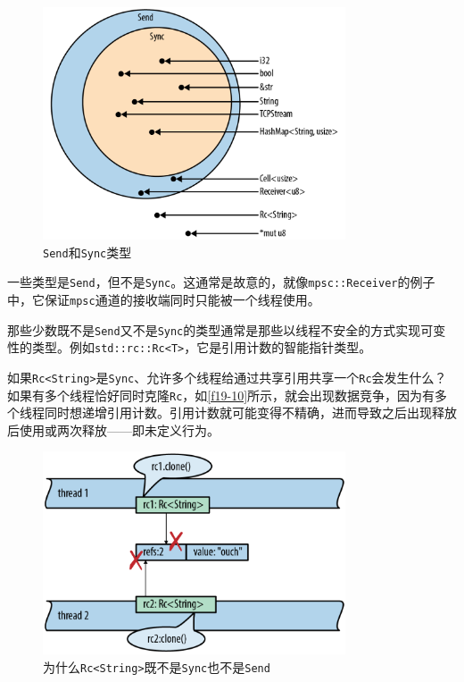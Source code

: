 \begin{figure}[htbp]
    \centering
    \includegraphics[width=0.8\textwidth]{../img/f19-9.png}
    \caption{\texttt{Send}和\texttt{Sync}类型}
    \label{f19-9}
\end{figure}

一些类型是\texttt{Send}，但不是\texttt{Sync}。这通常是故意的，就像\texttt{mpsc::Receiver}的例子中，它保证\texttt{mpsc}通道的接收端同时只能被一个线程使用。

那些少数既不是\texttt{Send}又不是\texttt{Sync}的类型通常是那些以线程不安全的方式实现可变性的类型。例如\texttt{std::rc::Rc<T>}，它是引用计数的智能指针类型。

如果\texttt{Rc<String>}是\texttt{Sync}、允许多个线程给通过共享引用共享一个\texttt{Rc}会发生什么？如果有多个线程恰好同时克隆\texttt{Rc}，如\autoref{f19-10}所示，就会出现数据竞争，因为有多个线程同时想递增引用计数。引用计数就可能变得不精确，进而导致之后出现释放后使用或两次释放——即未定义行为。

\begin{figure}[htbp]
    \centering
    \includegraphics[width=0.8\textwidth]{../img/f19-10.png}
    \caption{为什么\texttt{Rc<String>}既不是\texttt{Sync}也不是\texttt{Send}}
    \label{f19-10}
\end{figure}

